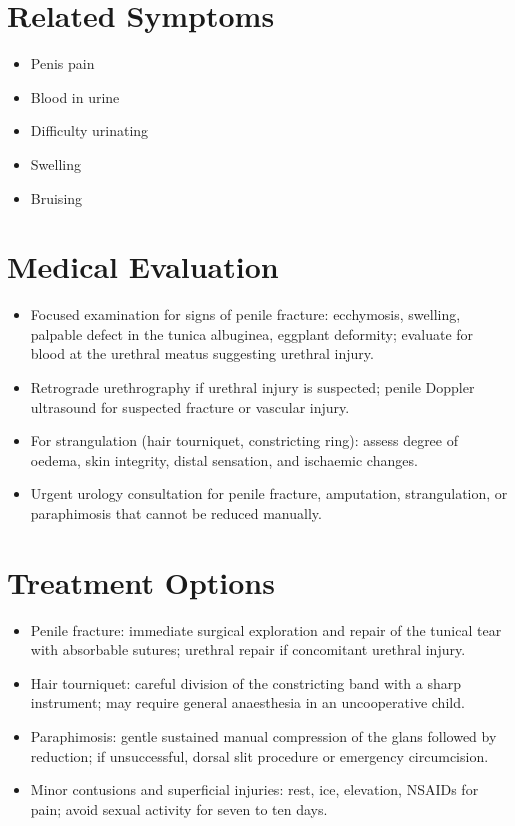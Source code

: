 \section*{Related Symptoms}
\begin{itemize}
  \item Penis pain
  \item Blood in urine
  \item Difficulty urinating
  \item Swelling
  \item Bruising
\end{itemize}

\section*{Medical Evaluation}
\begin{itemize}
  \item Focused examination for signs of penile fracture: ecchymosis, swelling, palpable defect in the tunica albuginea, eggplant deformity; evaluate for blood at the urethral meatus suggesting urethral injury.
  \item Retrograde urethrography if urethral injury is suspected; penile Doppler ultrasound for suspected fracture or vascular injury.
  \item For strangulation (hair tourniquet, constricting ring): assess degree of oedema, skin integrity, distal sensation, and ischaemic changes.
  \item Urgent urology consultation for penile fracture, amputation, strangulation, or paraphimosis that cannot be reduced manually.
\end{itemize}

\section*{Treatment Options}
\begin{itemize}
  \item Penile fracture: immediate surgical exploration and repair of the tunical tear with absorbable sutures; urethral repair if concomitant urethral injury.
  \item Hair tourniquet: careful division of the constricting band with a sharp instrument; may require general anaesthesia in an uncooperative child.
  \item Paraphimosis: gentle sustained manual compression of the glans followed by reduction; if unsuccessful, dorsal slit procedure or emergency circumcision.
  \item Minor contusions and superficial injuries: rest, ice, elevation, NSAIDs for pain; avoid sexual activity for seven to ten days.
\end{itemize}

